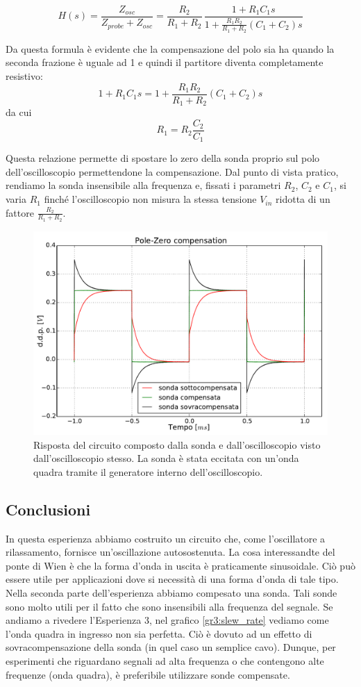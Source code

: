 \begin{equation}
H(s)=\frac{Z_{osc}}{Z_{probe}+Z_{osc}} = \frac{R_2}{R_1+R_2}\,\frac{1+R_1C_1s}{1+\frac{R_1R_2}{R_1+R_2}(C_1+C_2)s}
\end{equation}

Da questa formula è evidente che la compensazione del polo sia ha quando la seconda frazione è uguale ad \num{1} e quindi il partitore diventa completamente resistivo:
\begin{equation*}
1+R_1C_1s = 1+\frac{R_1R_2}{R_1+R_2}(C_1+C_2)s
\end{equation*}
da cui
\begin{equation}
R_1 = R_2 \frac{C_2}{C_1}
\end{equation}

Questa relazione permette di spostare lo zero della sonda proprio sul polo dell'oscilloscopio permettendone la compensazione.
Dal punto di vista pratico, rendiamo la sonda insensibile alla frequenza e, fissati i parametri $R_2$, $C_2$ e $C_1$, si varia $R_1$ finché l'oscilloscopio non misura la stessa tensione $V_{in}$ ridotta di un fattore $\frac{R_2}{R_1+R_2}$.

\begin{figure}[htpc]
\centering
\includegraphics[width=.65\textwidth]{../E08/latex/compensation.pdf}
\caption{Risposta del circuito composto dalla sonda e dall'oscilloscopio visto dall'oscilloscopio stesso. La sonda è stata eccitata con un'onda quadra tramite il generatore interno dell'oscilloscopio.}
\label{fig8:compensation}
\end{figure}

\subsection*{Conclusioni}
In questa esperienza abbiamo costruito un circuito che, come l'oscillatore a rilassamento, fornisce un'oscillazione autosostenuta. La cosa interessandte del ponte di Wien è che la forma d'onda in uscita è praticamente sinusoidale. Ciò può essere utile per applicazioni dove si necessità di una forma d'onda di tale tipo. Nella seconda parte dell'esperienza abbiamo compesato una sonda. Tali sonde sono molto utili per il fatto che sono insensibili alla frequenza del segnale. Se andiamo a rivedere l'Esperienza 3, nel grafico \ref{gr3:slew_rate} vediamo come l'onda quadra in ingresso non sia perfetta. Ciò è dovuto ad un effetto di sovracompensazione della sonda (in quel caso un semplice cavo). Dunque, per esperimenti che riguardano segnali ad alta frequenza o che contengono alte frequenze (onda quadra), è preferibile utilizzare sonde compensate.
